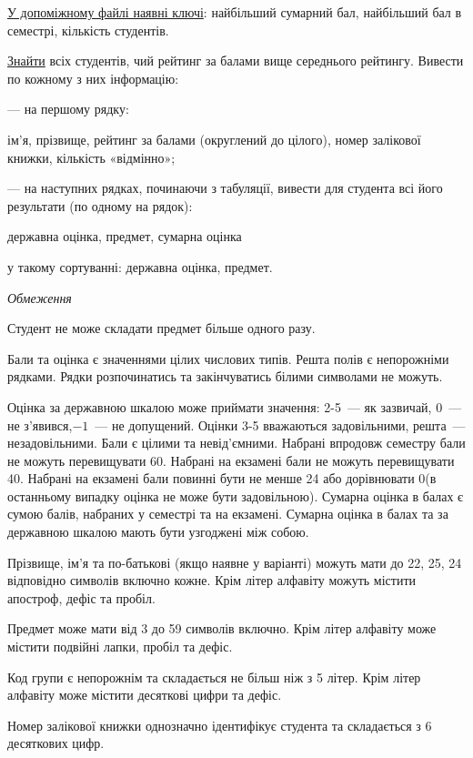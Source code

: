 \documentclass[11pt, ukrainian]{article}
\begin{document}
\underline{У допоміжному файлі наявні ключі}: найбільший сумарний бал, найбільший бал в семестрі, кількість студентів.

\underline{Знайти} всіх студентів, чий рейтинг за балами вище середнього рейтингу. Вивести по кожному з них інформацію:\par
{\noindent}--- на першому рядку:\par
ім’я, прізвище, рейтинг за балами (округлений до цілого), номер залікової книжки, кількість «відмінно»;

{\noindent}--- на наступних рядках, починаючи з табуляції, вивести для студента всі його результати (по одному на рядок):\par
державна оцінка, предмет, сумарна оцінка

{\noindent}у такому сортуванні: державна оцінка, предмет.


\bigskip\textit{Обмеження}

Студент не може складати предмет більше одного разу.

Бали та оцінка є значеннями цілих числових типів. Решта полів є непорожніми рядками.
Рядки розпочинатись та закінчуватись білими символами не можуть.

Оцінка за державною шкалою може приймати значення: 2-5~--- як зазвичай, 0~--- не з’явився,$-1$~--- не допущений. 
Оцінки 3-5 вважаються задовільними, решта~--- незадовільними. 
Бали є цілими та невід’ємними.
Набрані впродовж семестру бали не можуть перевищувати 60. 
Набрані на екзамені бали не можуть перевищувати 40. 
Набрані на екзамені бали повинні бути не менше 24 або дорівнювати 0(в останньому випадку оцінка не може бути задовільною). 
Сумарна оцінка в балах є сумою балів, набраних у семестрі та на екзамені.
Сумарна оцінка в балах та за державною шкалою мають бути узгоджені між собою.

Прізвище, ім’я та по-батькові (якщо наявне у варіанті) можуть мати до 22, 25, 24 відповідно символів включно кожне. 
Крім літер алфавіту можуть містити апостроф, дефіс та пробіл.

Предмет може мати від 3 до 59 символів включно. 
Крім літер алфавіту може містити подвійні лапки, пробіл та дефіс.

Код групи є непорожнім та складається не більш ніж з 5 літер. 
Крім літер алфавіту може містити десяткові цифри та дефіс.


Номер залікової книжки однозначно ідентифікує студента та складається з 6 десяткових цифр. 
\end{document}
